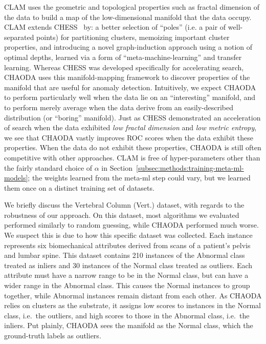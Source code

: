 CLAM uses the geometric and topological properties such as fractal dimension of the data to build a map of the low-dimensional manifold that the data occupy.
CLAM extends CHESS~\cite{ishaq2019clustered} by:
a better selection of ``poles'' (i.e. a pair of well-separated points) for partitioning clusters,
memoizing important cluster properties, and
introducing a novel graph-induction approach using a notion of optimal depths, learned via a form of ``meta-machine-learning'' and transfer learning.
Whereas CHESS was developed specifically for accelerating search,
CHAODA uses this manifold-mapping framework to discover properties of the manifold that are useful for anomaly detection.
Intuitively, we expect CHAODA to perform particularly well when the data lie on an ``interesting'' manifold, and to perform merely average when the data derive from an easily-described distribution (or ``boring'' manifold).
Just as CHESS demonstrated an acceleration of search when the data exhibited \emph{low fractal dimension} and \emph{low metric entropy}, we see that CHAODA vastly improves ROC scores when the data exhibit these properties.
When the data do not exhibit these properties, CHAODA is still often competitive with other approaches.
CLAM is free of hyper-parameters other than the fairly standard choice of $\alpha$ in Section~\ref{subsec:methods:training-meta-ml-models}; the weights learned from the meta-ml step could vary, but we learned them once on a distinct training set of datasets.

We briefly discuss the Vertebral Column (Vert.) dataset, with regards to the robustness of our approach.
On this dataset, most algorithms we evaluated performed similarly to random guessing, while CHAODA performed much worse.
We suspect this is due to how this specific dataset was collected.
Each instance represents six biomechanical attributes derived from scans of a patient's pelvis and lumbar spine.
This dataset contains 210 instances of the Abnormal class treated as inliers and 30 instances of the Normal class treated as outliers.
Each attribute must have a narrow range to be in the Normal class, but can have a wider range in the Abnormal class.
This causes the Normal instances to group together, while Abnormal instances remain distant from each other.
As CHAODA relies on clusters as the substrate, it assigns low scores to instances in the Normal class, i.e.\ the outliers, and high scores to those in the Abnormal class, i.e.\ the inliers.
Put plainly, CHAODA sees the manifold as the Normal class, which the ground-truth labels as outliers.


